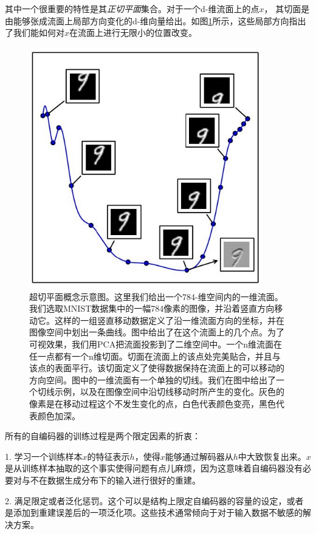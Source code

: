 其中一个很重要的特性是其\emph{正切平面}集合。对于一个d-维流面上的点$x$， 其切面是由能够张成流面上局部方向变化的d-维向量给出。如图\ref{fig:14.6}所示，这些局部方向指出了我们能如何对$x$在流面上进行无限小的位置改变。
\begin{figure}[htbp] %
   \centering
   \includegraphics[width=4in]{fig/chap14/14_6.jpg} 
   \caption{超切平面概念示意图。这里我们给出一个784-维空间内的一维流面。我们选取MNIST数据集中的一幅784像素的图像，并沿着竖直方向移动它。这样的一组竖直移动数据定义了沿一维流面方向的坐标，并在图像空间中划出一条曲线。图中给出了在这个流面上的几个点。为了可视效果，我们用PCA把流面投影到了二维空间中。一个n维流面在任一点都有一个n维切面。切面在流面上的该点处完美贴合，并且与该点的表面平行。该切面定义了使得数据保持在流面上的可以移动的方向空间。图中的一维流面有一个单独的切线。我们在图中给出了一个切线示例，以及在图像空间中沿切线移动时所产生的变化。灰色的像素是在移动过程这个不发生变化的点，白色代表颜色变亮，黑色代表颜色加深。}
   \label{fig:14.6}
\end{figure}

所有的自编码器的训练过程是两个限定因素的折衷：

1. 学习一个训练样本$x$的特征表示$h$，使得$x$能够通过解码器从$h$中大致恢复出来。$x$是从训练样本抽取的这个事实使得问题有点儿麻烦，因为这意味着自编码器没有必要对与不在数据生成分布下的输入进行很好的重建。

2. 满足限定或者泛化惩罚。这个可以是结构上限定自编码器的容量的设定，或者是添加到重建误差后的一项泛化项。这些技术通常倾向于对于输入数据不敏感的解决方案。

